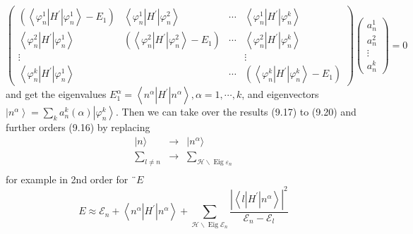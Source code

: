 {\large{
\begin{equation}
\left(\begin{array}{cccc}{\left(\left\langle\varphi_{n}^{1}\left|H^{\prime}\right| \varphi_{n}^{1}\right\rangle- E_{1}\right)} & {\left\langle\varphi_{n}^{1}\left|H^{\prime}\right| \varphi_{n}^{2}\right\rangle} & {\cdots} & {\left\langle\varphi_{n}^{1}\left|H^{\prime}\right| \varphi_{n}^{k}\right\rangle} \\ {\left\langle\varphi_{n}^{2}\left|H^{\prime}\right| \varphi_{n}^{1}\right\rangle} & {\left(\left\langle\varphi_{n}^{2}\left|H^{\prime}\right| \varphi_{n}^{2}\right\rangle- E_{1}\right)} & {\cdots} & {\left\langle\varphi_{n}^{2}\left|H^{\prime}\right| \varphi_{n}^{k}\right\rangle} \\ {\vdots} & {} & {} & {\vdots} \\ {\left\langle\varphi_{n}^{k}\left|H^{\prime}\right| \varphi_{n}^{1}\right\rangle} & {} & {\cdots} & {\left(\left\langle\varphi_{n}^{k}\left|H^{\prime}\right| \varphi_{n}^{k}\right\rangle- E_{1}\right)}\end{array}\right)\left(\begin{array}{c}{a_{n}^{1}} \\ {a_{n}^{2}} \\ {\vdots} \\ {a_{n}^{k}}\end{array}\right)=0
\end{equation}
}}
and get the eigenvalues $E_{1}^{\alpha}=\left\langle n^{\alpha}\left|H^{\prime}\right| n^{\alpha}\right\rangle, \alpha= 1, \cdots, k$, and eigenvectors $\left|n^{\alpha}\right\rangle=\sum_{k} a_{n}^{k}(\alpha)\left|\varphi_{n}^{k}\right\rangle$. Then we can take over the results (9.17) to (9.20) and further orders (9.16) by replacing
\begin{equation}
\begin{array}{ccl}
        |n\rangle & \rightarrow & |n^{\alpha}\rangle \\
        \sum\limits_{l \neq n} & \rightarrow & \sum\limits_{\mathcal{H} \backslash \operatorname{Eig} \varepsilon_n} \\
        \
\end{array}
\end{equation}
for example in 2nd order for $¨ E$
%
\begin{equation}
    E \approx \mathcal{E}_{n}+\left\langle n^{\alpha}\left|H^{\prime}\right| n^{\alpha}\right\rangle+\sum_{\mathcal{H} \backslash \operatorname{Eig} \mathcal{E}_{n}} \frac{\left|\left\langle l\left|H^{\prime}\right| n^{\alpha}\right\rangle\right|^{2}}{\mathcal{E}_{n}-\mathcal{E}_{l}}
    \end{equation}
